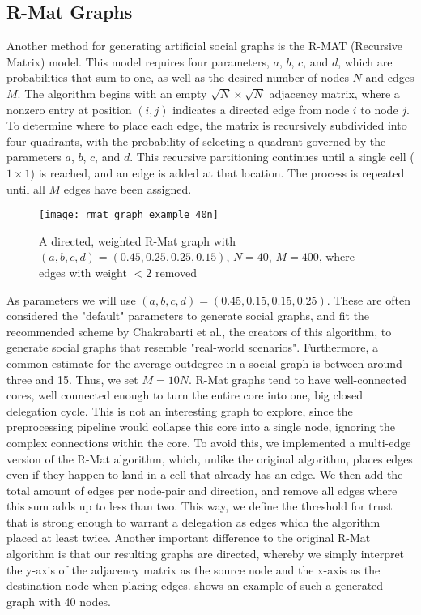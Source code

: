\subsection{R-Mat Graphs}

Another method for generating artificial social graphs is the R-MAT (Recursive Matrix) model. This model requires four parameters, $a$, $b$, $c$, and $d$, which are probabilities that sum to one, as well as the desired number of nodes $N$ and edges $M$. The algorithm begins with an empty $\sqrt{N} \times \sqrt{N}$ adjacency matrix, where a nonzero entry at position $(i, j)$ indicates a directed edge from node $i$ to node $j$. To determine where to place each edge, the matrix is recursively subdivided into four quadrants, with the probability of selecting a quadrant governed by the parameters $a$, $b$, $c$, and $d$. This recursive partitioning continues until a single cell ($1 \times 1$) is reached, and an edge is added at that location. The process is repeated until all $M$ edges have been assigned. \cite{chakrabartiRMATRecursiveModel2004}

\begin{figure}
\centering
\texttt{[image: rmat\_graph\_example\_40n]}
\caption{A directed, weighted R-Mat graph with $(a, b, c, d) = (0.45, 0.25, 0.25, 0.15)$, $N = 40$, $M = 400$, where edges with weight $< 2$ removed}
\label{fig:rmat_example}
\end{figure}

As parameters we will use $(a, b, c, d) = (0.45, 0.15, 0.15, 0.25)$. These are often considered the "default" parameters to generate social graphs, and fit the recommended scheme by Chakrabarti et al., the creators of this algorithm, to generate social graphs that resemble "real-world scenarios". Furthermore, a common estimate for the average outdegree in a social graph is between around three and 15. \cite{chakrabartiRMATRecursiveModel2004, zhouKanonymityLdiversityApproaches2011} Thus, we set $M = 10 N$. R-Mat graphs tend to have well-connected cores, well connected enough to turn the entire core into one, big closed delegation cycle. This is not an interesting graph to explore, since the preprocessing pipeline would collapse this core into a single node, ignoring the complex connections within the core. To avoid this, we implemented a multi-edge version of the R-Mat algorithm, which, unlike the original algorithm, places edges even if they happen to land in a cell that already has an edge. We then add the total amount of edges per node-pair and direction, and remove all edges where this sum adds up to less than two. This way, we define the threshold for trust that is strong enough to warrant a delegation as edges which the algorithm placed at least twice. Another important difference to the original R-Mat algorithm is that our resulting graphs are directed, whereby we simply interpret the y-axis of the adjacency matrix as the source node and the x-axis as the destination node when placing edges.  shows an example of such a generated graph with 40 nodes.

